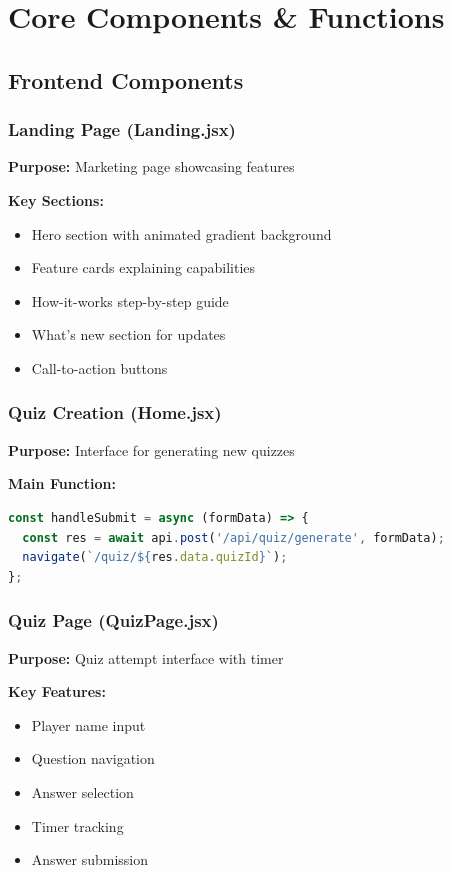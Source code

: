 \documentclass[12pt,a4paper]{article}
\begin{document}
\newpage

\section{Core Components \& Functions}

\subsection{Frontend Components}

\subsubsection{Landing Page (Landing.jsx)}
\textbf{Purpose:} Marketing page showcasing features

\textbf{Key Sections:}
\begin{itemize}
    \item Hero section with animated gradient background
    \item Feature cards explaining capabilities
    \item How-it-works step-by-step guide
    \item What's new section for updates
    \item Call-to-action buttons
\end{itemize}

\subsubsection{Quiz Creation (Home.jsx)}
\textbf{Purpose:} Interface for generating new quizzes

\textbf{Main Function:}
\begin{lstlisting}[language=JavaScript]
const handleSubmit = async (formData) => {
  const res = await api.post('/api/quiz/generate', formData);
  navigate(`/quiz/${res.data.quizId}`);
};
\end{lstlisting}

\subsubsection{Quiz Page (QuizPage.jsx)}
\textbf{Purpose:} Quiz attempt interface with timer

\textbf{Key Features:}
\begin{itemize}
    \item Player name input
    \item Question navigation
    \item Answer selection
    \item Timer tracking
    \item Answer submission
\end{itemize}
\end{document}
